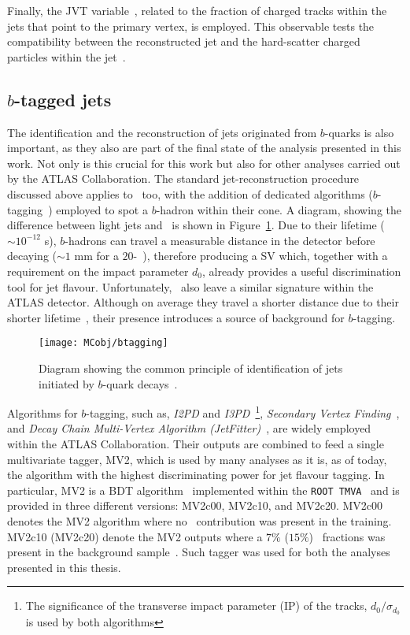 			Finally, the \ac{JVT} variable~\cite{ATLAS-CONF-2014-018}, related to the fraction of charged tracks within the jets that point to the primary vertex, is employed. This observable tests the compatibility between the reconstructed jet and the hard-scatter charged particles within the jet~\cite{Aaboud:2017pou}.


		\subsection*{$b$-tagged jets}

			The identification and the reconstruction of jets originated from $b$-quarks is also important, as they also are part of the final state of the analysis presented in this work. Not only is this crucial for this work but also for other analyses carried out by the \ac{ATLAS} Collaboration. The standard jet-reconstruction procedure discussed above applies to \bjs\, too, with the addition of dedicated algorithms ($b$-tagging~\cite{Aad:2015ydr}) employed to spot a $b$-hadron within their cone. A diagram, showing the difference between light jets and \bjs\, is shown in Figure~\ref{fig:btagpic}. Due to their lifetime ($\sim 10^{-12}$ s), $b$-hadrons can travel a measurable distance in the detector before decaying ($\sim 1$ mm for a $20$-\GeV\ \bj), therefore producing a \ac{SV} which, together with a requirement on the impact parameter $d_0$, already provides a useful discrimination tool for jet flavour. Unfortunately, \cjs\ also leave a similar signature within the ATLAS detector. Although on average they travel a shorter distance due to their shorter lifetime~\cite{ATL-PHYS-PUB-2015-001}, their presence introduces a source of background for $b$-tagging. 

			\begin{figure}[!htb]
				\centering
				\texttt{[image: MCobj/btagging]}
				\caption{\label{fig:btagpic} Diagram showing the common principle of identification of jets initiated by $b$-quark decays~\cite{btagpic}.}
			\end{figure}

			Algorithms for $b$-tagging, such as, \emph{I2PD} and \emph{I3PD}~\cite{Lehmacher:1128662}\footnote{The significance of the transverse impact parameter (IP) of the tracks, $d_0/\sigma_{d_0}$ is used by both algorithms}, \emph{Secondary Vertex Finding}~\cite{ATL-PHYS-PUB-2017-011}, and \emph{Decay Chain Multi-Vertex Algorithm (JetFitter)}~\cite{1742-6596-119-3-032032}, are widely employed within the \ac{ATLAS} Collaboration. Their outputs are combined to feed a single multivariate tagger, \ac{MV2}, which is used by many analyses as it is, as of today, the algorithm with the highest discriminating power for jet flavour tagging. In particular, \ac{MV2} is a \ac{BDT} algorithm~\cite{BDT} implemented within the \texttt{ROOT TMVA}~\cite{Brun:1997pa, 2007physics3039H} and is provided in three different versions: MV2c00, MV2c10, and MV2c20. MV2c00 denotes the MV2 algorithm where no \cj\ contribution was present in the training. MV2c10 (MV2c20) denote the MV2 outputs where a $7\%$ ($15\%$) \cj\ fractions was present in the background sample~\cite{Aad:2015ydr}. Such tagger was used for both the analyses presented in this thesis.

